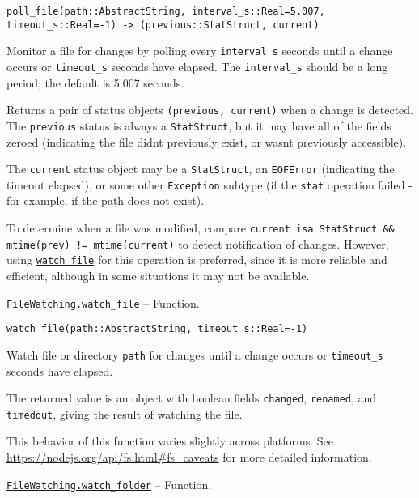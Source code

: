 \begin{adjustwidth}{2em}{0pt}


\begin{verbatim}
poll_file(path::AbstractString, interval_s::Real=5.007, timeout_s::Real=-1) -> (previous::StatStruct, current)
\end{verbatim}

Monitor a file for changes by polling every \texttt{interval\_s} seconds until a change occurs or \texttt{timeout\_s} seconds have elapsed. The \texttt{interval\_s} should be a long period; the default is 5.007 seconds.

Returns a pair of status objects \texttt{(previous, current)} when a change is detected. The \texttt{previous} status is always a \texttt{StatStruct}, but it may have all of the fields zeroed (indicating the file didn{\textquotesingle}t previously exist, or wasn{\textquotesingle}t previously accessible).

The \texttt{current} status object may be a \texttt{StatStruct}, an \texttt{EOFError} (indicating the timeout elapsed), or some other \texttt{Exception} subtype (if the \texttt{stat} operation failed - for example, if the path does not exist).

To determine when a file was modified, compare \texttt{current isa StatStruct \&\& mtime(prev) != mtime(current)} to detect notification of changes. However, using \hyperlink{9407226289289061636}{\texttt{watch\_file}} for this operation is preferred, since it is more reliable and efficient, although in some situations it may not be available.



\end{adjustwidth}
\hypertarget{9407226289289061636}{}
\hyperlink{9407226289289061636}{\texttt{FileWatching.watch\_file}}  -- {Function.}

\begin{adjustwidth}{2em}{0pt}


\begin{verbatim}
watch_file(path::AbstractString, timeout_s::Real=-1)
\end{verbatim}

Watch file or directory \texttt{path} for changes until a change occurs or \texttt{timeout\_s} seconds have elapsed.

The returned value is an object with boolean fields \texttt{changed}, \texttt{renamed}, and \texttt{timedout}, giving the result of watching the file.

This behavior of this function varies slightly across platforms. See \href{https://nodejs.org/api/fs.html\#fs\_caveats}{https://nodejs.org/api/fs.html\#fs\_caveats} for more detailed information.



\end{adjustwidth}
\hypertarget{3977882412787158374}{}
\hyperlink{3977882412787158374}{\texttt{FileWatching.watch\_folder}}  -- {Function.}

